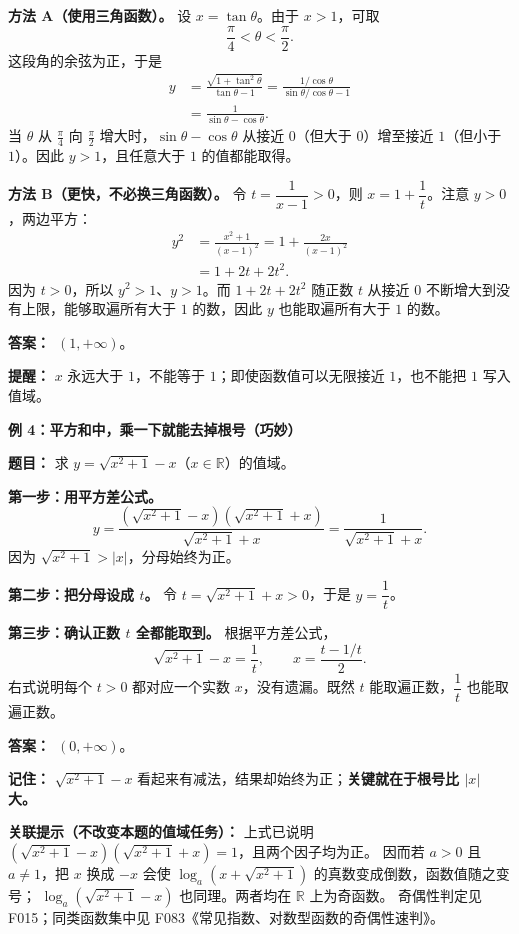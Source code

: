 \begin{examplebox}
  \textbf{方法 A（使用三角函数）。} 设 $x=\tan\theta$。由于 $x>1$，可取
  \[
    \frac{\pi}{4}<\theta<\frac{\pi}{2}.
  \]
  这段角的余弦为正，于是
  \[
    \begin{aligned}
      y&=\frac{\sqrt{1+\tan^2\theta}}{\tan\theta-1}
         =\frac{1/\cos\theta}{\sin\theta/\cos\theta-1}\\
       &=\frac{1}{\sin\theta-\cos\theta}.
    \end{aligned}
  \]
  当 $\theta$ 从 $\frac\pi4$ 向 $\frac\pi2$ 增大时，$\sin\theta-\cos\theta$ 从接近 $0$（但大于 $0$）增至接近 $1$（但小于 $1$）。因此 $y>1$，且任意大于 $1$ 的值都能取得。

  \textbf{方法 B（更快，不必换三角函数）。} 令 $t=\dfrac{1}{x-1}>0$，则 $x=1+\dfrac1t$。注意 $y>0$，两边平方：
  \[
    \begin{aligned}
      y^2&=\frac{x^2+1}{(x-1)^2}
      =1+\frac{2x}{(x-1)^2}\\
      &=1+2t+2t^2.
    \end{aligned}
  \]
  因为 $t>0$，所以 $y^2>1$、$y>1$。而 $1+2t+2t^2$ 随正数 $t$ 从接近 $0$ 不断增大到没有上限，能够取遍所有大于 $1$ 的数，因此 $y$ 也能取遍所有大于 $1$ 的数。

  \textbf{答案：}\ $\boxed{(1,+\infty)}$。

  \textbf{提醒：} $x$ 永远大于 $1$，不能等于 $1$；即使函数值可以无限接近 $1$，也不能把 $1$ 写入值域。

  \medskip
  \textbf{\textcolor{CExample}{例 4：平方和中，乘一下就能去掉根号（巧妙）}}

  \textbf{题目：} 求 $y=\sqrt{x^2+1}-x$（$x\in\mathbb{R}$）的值域。

  \textbf{第一步：用平方差公式。}
  \[
    y=\frac{(\sqrt{x^2+1}-x)(\sqrt{x^2+1}+x)}{\sqrt{x^2+1}+x}
     =\frac{1}{\sqrt{x^2+1}+x}.
  \]
  因为 $\sqrt{x^2+1}>|x|$，分母始终为正。

  \textbf{第二步：把分母设成 $t$。} 令 $t=\sqrt{x^2+1}+x>0$，于是 $y=\dfrac1t$。

  \textbf{第三步：确认正数 $t$ 全都能取到。} 根据平方差公式，
  \[
    \sqrt{x^2+1}-x=\frac1t,
    \qquad x=\frac{t-1/t}{2}.
  \]
  右式说明每个 $t>0$ 都对应一个实数 $x$，没有遗漏。既然 $t$ 能取遍正数，$\dfrac1t$ 也能取遍正数。

  \textbf{答案：}\ $\boxed{(0,+\infty)}$。

  \textbf{记住：} $\sqrt{x^2+1}-x$ 看起来有减法，结果却始终为正；\textbf{关键就在于根号比 $|x|$ 大。}


  \textbf{关联提示（不改变本题的值域任务）：} 上式已说明
  $(\sqrt{x^2+1}-x)(\sqrt{x^2+1}+x)=1$，且两个因子均为正。
  因而若 $a>0$ 且 $a\ne1$，把 $x$ 换成 $-x$ 会使
  $\log_a(x+\sqrt{x^2+1})$ 的真数变成倒数，函数值随之变号；
  $\log_a(\sqrt{x^2+1}-x)$ 也同理。两者均在 $\mathbb R$ 上为奇函数。
  奇偶性判定见 F015；同类函数集中见 F083《常见指数、对数型函数的奇偶性速判》。


\end{examplebox}
